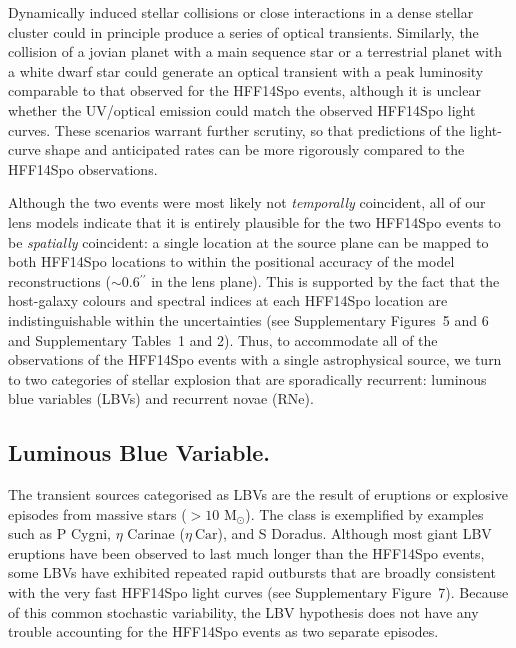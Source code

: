 \documentclass{article}
\providecommand\citep{\cite}
\def\arcsec{\ensuremath{^{\prime\prime}}\xspace}
\def\Msun{\mbox{M$_{\odot}$}\xspace}
\def\etaCar{\ensuremath{\eta~\mbox{Car}}\xspace}
\def\spock{HFF14Spo\xspace}
\begin{document}
Dynamically induced stellar collisions or close interactions in a
dense stellar cluster\citep{Fregeau:2004} could in principle produce a
series of optical transients. Similarly, the collision of a jovian
planet with a main sequence star\cite{Metzger:2012,Yamazaki:2017} or a
terrestrial planet with a white dwarf star\cite{Di-Stefano:2015} could
generate an optical transient with a peak luminosity comparable to
that observed for the \spock events, although it is unclear whether
the UV/optical emission could match the observed \spock light curves.
These scenarios warrant further scrutiny, so that predictions of the
light-curve shape and anticipated rates can be more rigorously
compared to the \spock observations.

Although the two events were most likely not {\it temporally}
coincident, all of our lens models indicate that it is entirely
plausible for the two \spock events to be {\it spatially} coincident:
a single location at the source plane can be mapped to both \spock
locations to within the positional accuracy of the model
reconstructions ($\sim0.6$\arcsec in the lens plane). This is
supported by the fact that the host-galaxy colours and spectral indices
at each \spock location are indistinguishable within the uncertainties
(see Supplementary Figures~5 and 6 and Supplementary
Tables~1 and 2).  Thus, to accommodate all of the
observations of the \spock events with a single astrophysical source,
we turn to two categories of stellar explosion that are sporadically
recurrent: luminous blue variables (LBVs) and recurrent novae (RNe).

\subsection{Luminous Blue Variable.}

The transient sources categorised as LBVs are the result of eruptions
or explosive episodes from massive stars ($>10$ \Msun). The class is
exemplified by examples such as P Cygni, $\eta$ Carinae (\etaCar), and
S Doradus\cite{Smith:2011b, Kochanek:2012}.  Although most giant LBV
eruptions have been observed to last much longer than the \spock
events\cite{Smith:2011b}, some LBVs have exhibited repeated rapid
outbursts that are broadly consistent with the very fast \spock light
curves (see Supplementary Figure~7). Because of this common
stochastic variability, the LBV hypothesis does not have any trouble
accounting for the \spock events as two separate episodes.
\end{document}
